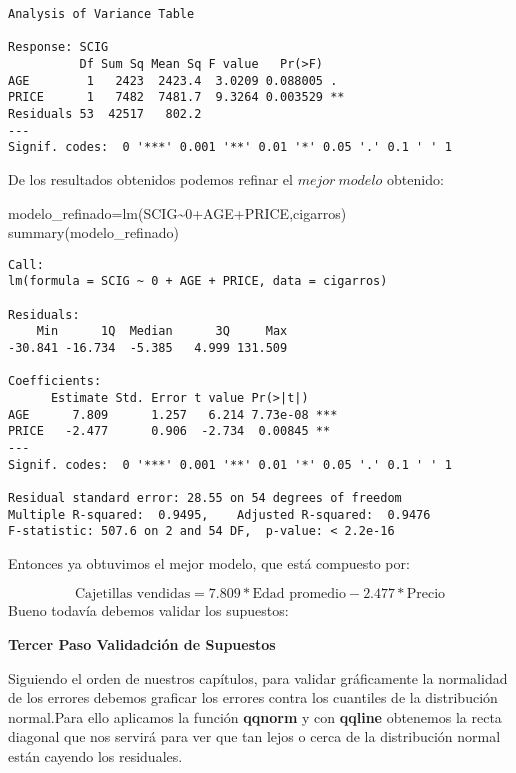 \documentclass[
  a4paper,
  oneside,
  openany]{book}
\newenvironment{Shaded}{\begin{snugshade}}{\end{snugshade}}
\newcommand{\DecValTok}[1]{\textcolor[rgb]{0.00,0.00,0.81}{#1}}
\newcommand{\FunctionTok}[1]{\textcolor[rgb]{0.00,0.00,0.00}{#1}}
\newcommand{\NormalTok}[1]{#1}
\newcommand{\OtherTok}[1]{\textcolor[rgb]{0.56,0.35,0.01}{#1}}
\newcommand{\SpecialCharTok}[1]{\textcolor[rgb]{0.00,0.00,0.00}{#1}}
\begin{document}
\begin{verbatim}
Analysis of Variance Table

Response: SCIG
          Df Sum Sq Mean Sq F value   Pr(>F)   
AGE        1   2423  2423.4  3.0209 0.088005 . 
PRICE      1   7482  7481.7  9.3264 0.003529 **
Residuals 53  42517   802.2                    
---
Signif. codes:  0 '***' 0.001 '**' 0.01 '*' 0.05 '.' 0.1 ' ' 1
\end{verbatim}

De los resultados obtenidos podemos refinar el \(mejor \ modelo\) obtenido:

\begin{Shaded}
\begin{Highlighting}[]
\NormalTok{modelo\_refinado}\OtherTok{=}\FunctionTok{lm}\NormalTok{(SCIG}\SpecialCharTok{\textasciitilde{}}\DecValTok{0}\SpecialCharTok{+}\NormalTok{AGE}\SpecialCharTok{+}\NormalTok{PRICE,cigarros)}
\FunctionTok{summary}\NormalTok{(modelo\_refinado)}
\end{Highlighting}
\end{Shaded}

\begin{verbatim}
Call:
lm(formula = SCIG ~ 0 + AGE + PRICE, data = cigarros)

Residuals:
    Min      1Q  Median      3Q     Max 
-30.841 -16.734  -5.385   4.999 131.509 

Coefficients:
      Estimate Std. Error t value Pr(>|t|)    
AGE      7.809      1.257   6.214 7.73e-08 ***
PRICE   -2.477      0.906  -2.734  0.00845 ** 
---
Signif. codes:  0 '***' 0.001 '**' 0.01 '*' 0.05 '.' 0.1 ' ' 1

Residual standard error: 28.55 on 54 degrees of freedom
Multiple R-squared:  0.9495,    Adjusted R-squared:  0.9476 
F-statistic: 507.6 on 2 and 54 DF,  p-value: < 2.2e-16
\end{verbatim}

Entonces ya obtuvimos el mejor modelo, que está compuesto por:

\[\mbox{Cajetillas vendidas}= 7.809*\mbox{Edad promedio}-2.477*\mbox{Precio}\]
Bueno todavía debemos validar los supuestos:

\textbf{Tercer Paso Validadción de Supuestos}

Siguiendo el orden de nuestros capítulos, para validar gráficamente la normalidad de los errores debemos graficar los errores contra los cuantiles de la distribución normal.Para ello aplicamos la función \textbf{qqnorm} y con \textbf{qqline} obtenemos la recta diagonal que nos servirá para ver que tan lejos o cerca de la distribución normal están cayendo los residuales.
\end{document}
